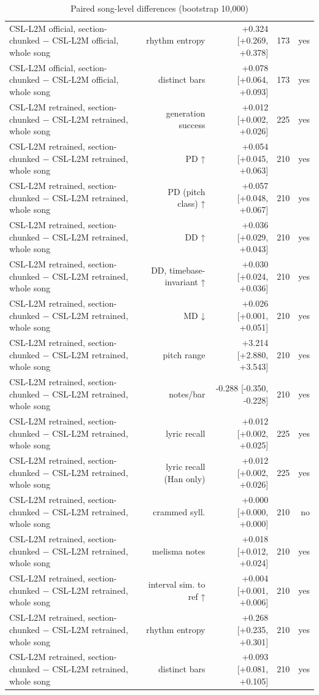 \begin{table}[t]
\begin{tabular}{lrrrr}
CSL-L2M official, section-chunked $-$ CSL-L2M official, whole song & rhythm entropy & +0.324 [+0.269, +0.378] & 173 & yes \\
CSL-L2M official, section-chunked $-$ CSL-L2M official, whole song & distinct bars & +0.078 [+0.064, +0.093] & 173 & yes \\
CSL-L2M retrained, section-chunked $-$ CSL-L2M retrained, whole song & generation success & +0.012 [+0.002, +0.026] & 225 & yes \\
CSL-L2M retrained, section-chunked $-$ CSL-L2M retrained, whole song & PD ↑ & +0.054 [+0.045, +0.063] & 210 & yes \\
CSL-L2M retrained, section-chunked $-$ CSL-L2M retrained, whole song & PD (pitch class) ↑ & +0.057 [+0.048, +0.067] & 210 & yes \\
CSL-L2M retrained, section-chunked $-$ CSL-L2M retrained, whole song & DD ↑ & +0.036 [+0.029, +0.043] & 210 & yes \\
CSL-L2M retrained, section-chunked $-$ CSL-L2M retrained, whole song & DD, timebase-invariant ↑ & +0.030 [+0.024, +0.036] & 210 & yes \\
CSL-L2M retrained, section-chunked $-$ CSL-L2M retrained, whole song & MD ↓ & +0.026 [+0.001, +0.051] & 210 & yes \\
CSL-L2M retrained, section-chunked $-$ CSL-L2M retrained, whole song & pitch range & +3.214 [+2.880, +3.543] & 210 & yes \\
CSL-L2M retrained, section-chunked $-$ CSL-L2M retrained, whole song & notes/bar & -0.288 [-0.350, -0.228] & 210 & yes \\
CSL-L2M retrained, section-chunked $-$ CSL-L2M retrained, whole song & lyric recall & +0.012 [+0.002, +0.025] & 225 & yes \\
CSL-L2M retrained, section-chunked $-$ CSL-L2M retrained, whole song & lyric recall (Han only) & +0.012 [+0.002, +0.026] & 225 & yes \\
CSL-L2M retrained, section-chunked $-$ CSL-L2M retrained, whole song & crammed syll. & +0.000 [+0.000, +0.000] & 210 & no \\
CSL-L2M retrained, section-chunked $-$ CSL-L2M retrained, whole song & melisma notes & +0.018 [+0.012, +0.024] & 210 & yes \\
CSL-L2M retrained, section-chunked $-$ CSL-L2M retrained, whole song & interval sim. to ref ↑ & +0.004 [+0.001, +0.006] & 210 & yes \\
CSL-L2M retrained, section-chunked $-$ CSL-L2M retrained, whole song & rhythm entropy & +0.268 [+0.235, +0.301] & 210 & yes \\
CSL-L2M retrained, section-chunked $-$ CSL-L2M retrained, whole song & distinct bars & +0.093 [+0.081, +0.105] & 210 & yes \\
\bottomrule
\end{tabular}
\caption{Paired song-level differences (bootstrap 10,000)}
\label{tab:lyrics_to_melody_paired}
\end{table}
